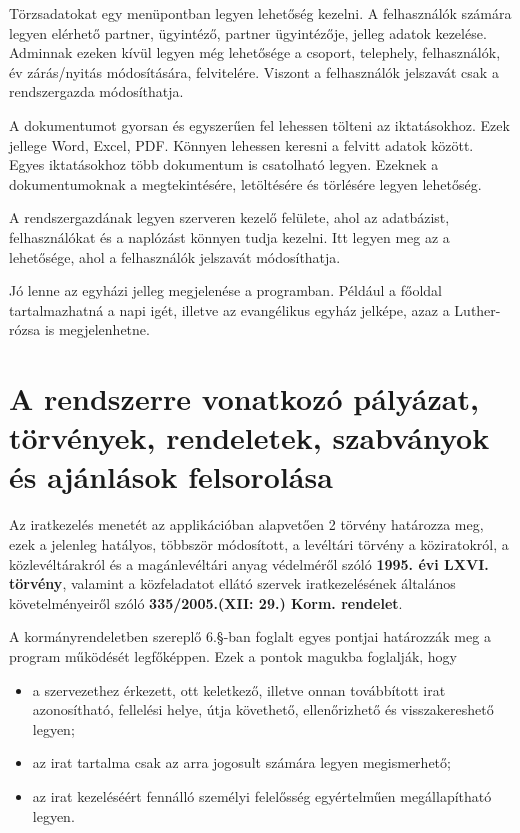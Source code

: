 \documentclass[
]{thesis-ekf}
\theoremstyle{definition}
\theoremstyle{remark}
\begin{document}
Törzsadatokat egy menüpontban legyen lehetőség kezelni. A felhasználók számára legyen elérhető partner, ügyintéző, partner ügyintézője, jelleg adatok kezelése. Adminnak ezeken kívül legyen még lehetősége a csoport, telephely, felhasználók, év zárás/nyitás módosítására, felvitelére.  Viszont a felhasználók jelszavát csak a rendszergazda módosíthatja.

A dokumentumot gyorsan és egyszerűen fel lehessen tölteni az iktatásokhoz. Ezek jellege Word, Excel, PDF. Könnyen lehessen keresni a felvitt adatok között. Egyes iktatásokhoz több dokumentum is csatolható legyen. Ezeknek a dokumentumoknak a megtekintésére, letöltésére és törlésére legyen lehetőség. 

A rendszergazdának legyen szerveren kezelő felülete, ahol az adatbázist, felhasználókat és a naplózást könnyen tudja kezelni. Itt legyen meg az a lehetősége, ahol a felhasználók jelszavát módosíthatja.

Jó lenne az egyházi jelleg megjelenése a programban. Például a főoldal tartalmazhatná a napi igét, illetve az evangélikus egyház jelképe, azaz a Luther-rózsa is megjelenhetne.
\section{A rendszerre vonatkozó pályázat, törvények, rendeletek, szabványok és ajánlások felsorolása}
Az iratkezelés menetét az applikációban alapvetően 2 törvény határozza meg, ezek a jelenleg hatályos, többször módosított, a levéltári törvény a köziratokról, a közlevéltárakról és a magánlevéltári anyag védelméről szóló \textbf{1995. évi LXVI. törvény},\cite{torveny} valamint a közfeladatot ellátó szervek iratkezelésének általános követelményeiről szóló \textbf{335/2005.(XII: 29.) Korm. rendelet}\cite{rendelet}. 

A kormányrendeletben szereplő 6.§-ban foglalt egyes pontjai határozzák meg a program működését legfőképpen. Ezek a pontok magukba foglalják, hogy 
\begin{itemize}
	\item a szervezethez érkezett, ott keletkező, illetve onnan továbbított irat azonosítható, fellelési helye, útja követhető, ellenőrizhető és visszakereshető legyen;
	\item az irat tartalma csak az arra jogosult számára legyen megismerhető;
	\item az irat kezeléséért fennálló személyi felelősség egyértelműen megállapítható legyen.
\end{itemize}
\end{document}
